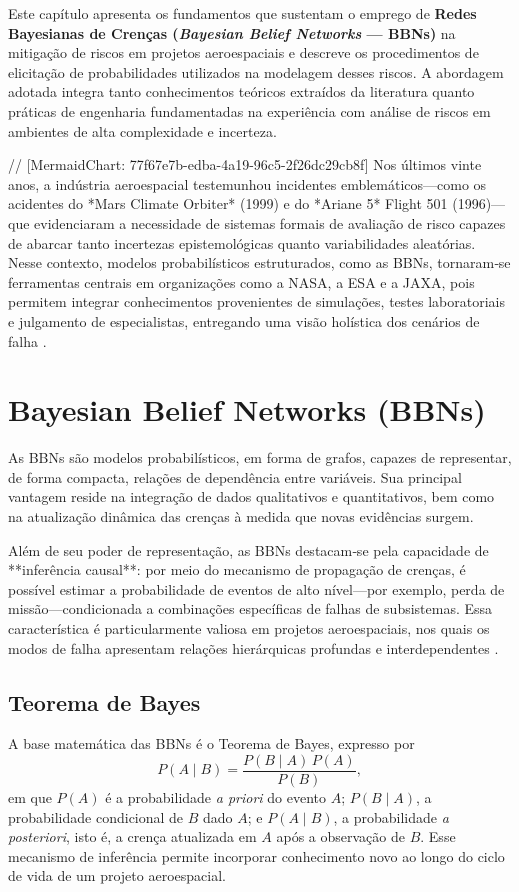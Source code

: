 Este capítulo apresenta os fundamentos que sustentam o emprego de \textbf{Redes Bayesianas de Crenças (\emph{Bayesian Belief Networks} — BBNs)} na mitigação de riscos em projetos aeroespaciais e descreve os procedimentos de elicitação de probabilidades utilizados na modelagem desses riscos. A abordagem adotada integra tanto conhecimentos teóricos extraídos da literatura quanto práticas de engenharia fundamentadas na experiência com análise de riscos em ambientes de alta complexidade e incerteza.


// [MermaidChart: 77f67e7b-edba-4a19-96c5-2f26dc29cb8f]
Nos últimos vinte anos, a indústria aeroespacial testemunhou incidentes emblemáticos—como os acidentes do *Mars Climate Orbiter* (1999) e do *Ariane 5* Flight 501 (1996)—que evidenciaram a necessidade de sistemas formais de avaliação de risco capazes de abarcar tanto incertezas epistemológicas quanto variabilidades aleatórias. Nesse contexto, modelos probabilísticos estruturados, como as BBNs, tornaram‑se ferramentas centrais em organizações como a NASA, a ESA e a JAXA, pois permitem integrar conhecimentos provenientes de simulações, testes laboratoriais e julgamento de especialistas, entregando uma visão holística dos cenários de falha \cite{banerjee2020risk, nasa2022safety}.




\section{Bayesian Belief Networks (BBNs)}
\label{sec:bbn}
As BBNs são modelos probabilísticos, em forma de grafos, capazes de representar, de forma compacta, relações de dependência entre variáveis. Sua principal vantagem reside na integração de dados qualitativos e quantitativos, bem como na atualização dinâmica das crenças à medida que novas evidências surgem.


Além de seu poder de representação, as BBNs destacam‑se pela capacidade de **inferência causal**: por meio do mecanismo de propagação de crenças, é possível estimar a probabilidade de eventos de alto nível—por exemplo, perda de missão—condicionada a combinações específicas de falhas de subsistemas. Essa característica é particularmente valiosa em projetos aeroespaciais, nos quais os modos de falha apresentam relações hierárquicas profundas e interdependentes \cite{pearl1988probabilistic}.

\subsection{Teorema de Bayes}
\label{subsec:bayes}
A base matemática das BBNs é o Teorema de Bayes, expresso por
\begin{equation}
  P(A\mid B) = \frac{P(B\mid A)\,P(A)}{P(B)},
  \label{eq:bayes}
\end{equation}
em que $P(A)$ é a probabilidade \emph{a priori} do evento $A$; $P(B\mid A)$, a probabilidade condicional de $B$ dado $A$; e $P(A\mid B)$, a probabilidade \emph{a posteriori}, isto é, a crença atualizada em $A$ após a observação de $B$. Esse mecanismo de inferência permite incorporar conhecimento novo ao longo do ciclo de vida de um projeto aeroespacial.

